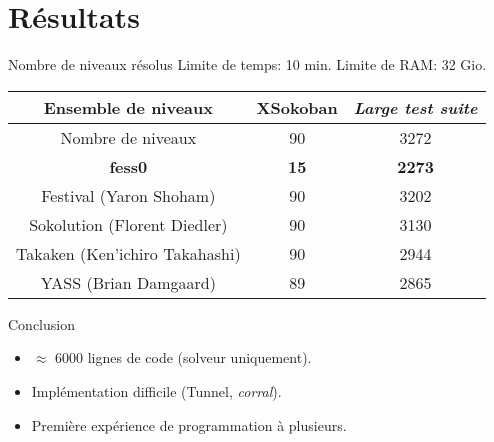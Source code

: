     \section{Résultats}
        \begin{frame}{Nombre de niveaux résolus}
            \centering
            Limite de temps: 10 min. Limite de RAM: 32 Gio.

            \vspace{0.42cm}
            \begin{tabular}{|c|c|c|}
                \hline
                Ensemble de niveaux            & XSokoban    & \textit{Large test suite} \\
                \hline
                Nombre de niveaux              & 90          & 3272 \\
                \hline
                \textbf{fess0}                 & \textbf{15} & \textbf{2273} \\
                \hline
                Festival (Yaron Shoham)        & 90          & 3202 \\
                \hline
                Sokolution (Florent Diedler)   & 90          & 3130 \\
                \hline
                Takaken (Ken'ichiro Takahashi) & 90          & 2944 \\
                \hline
                YASS (Brian Damgaard)          & 89          & 2865 \\
                \hline
            \end{tabular}

        \end{frame}

        \begin{frame}{Conclusion}
            \begin{itemize}
                \item $\approx$ 6000 lignes de code (solveur uniquement).
                \item Implémentation difficile (Tunnel, \textit{corral}).
                \item Première expérience de programmation à plusieurs.
            \end{itemize}
        \end{frame}


